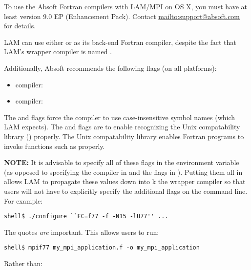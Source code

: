 
To use the Absoft Fortran compilers with LAM/MPI on OS X, you must
have at least version 9.0 EP (Enhancement Pack).  Contact
\url{mailto:support@absoft.com} for details.

LAM can use either  or  as its back-end Fortran
compiler, despite the fact that LAM's wrapper compiler is named
.

Additionally, Absoft recommends the following flags (on all
platforms):

\begin{itemize}
\item {} compiler:   

\item {} compiler:  
\end{itemize}

The  and  flags force the compiler
to use case-insensitive symbol names (which LAM expects).  The
 and  flags are to enable
recognizing the Unix compatability library () properly.
The Unix compatability library enables Fortran programs to invoke
functions such as  properly.

{\bf NOTE:} It is advisable to specify all of these flags in the
 environment variable (as opposed to specifying the
compiler in  and the flags in ).  Putting
them all in  allows LAM to propagate these values down
into k the  wrapper compiler so that users will not have
to explicitly specify the additional flags on the  command
line.  For example:

\lstset{style=lam-cmdline}
\begin{lstlisting}
shell$ ./configure ``FC=f77 -f -N15 -lU77'' ...
\end{lstlisting}

The quotes {\em are} important.  This allows users to run:

\lstset{style=lam-cmdline}
\begin{lstlisting}
shell$ mpif77 my_mpi_application.f -o my_mpi_application
\end{lstlisting}

Rather than:

